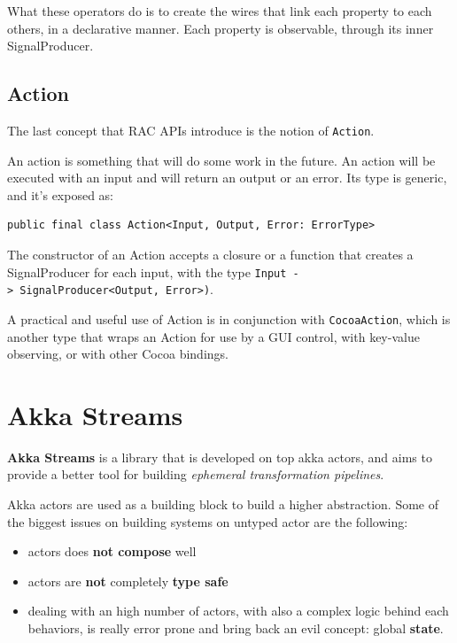What these operators do is to create the wires that link each property
to each others, in a declarative manner. Each property is observable,
through its inner SignalProducer.


\subsection{Action}\label{action}

The last concept that RAC APIs introduce is the notion of
\texttt{Action}.

An action is something that will do some work in the future. An action
will be executed with an input and will return an output or an error.
Its type is generic, and it's exposed as:

\begin{verbatim}
public final class Action<Input, Output, Error: ErrorType>
\end{verbatim}

The constructor of an Action accepts a closure or a function that
creates a SignalProducer for each input, with the type
\texttt{Input\ -\textgreater{}\ SignalProducer\textless{}Output,\ Error\textgreater{})}.

A practical and useful use of Action is in conjunction with
\texttt{CocoaAction}, which is another type that wraps an Action for use
by a GUI control, with key-value observing, or with other Cocoa
bindings.


\section{Akka Streams}\label{akka-streams}

\textbf{Akka Streams} is a library that is developed on top akka actors,
and aims to provide a better tool for building \emph{ephemeral
transformation pipelines}.

Akka actors are used as a building block to build a higher abstraction.
Some of the biggest issues on building systems on untyped actor are the
following:

\begin{itemize}
\itemsep1pt\parskip0pt
\item
  actors does \textbf{not compose} well
\item
  actors are \textbf{not} completely \textbf{type safe}
\item
  dealing with an high number of actors, with also a complex logic
  behind each behaviors, is really error prone and bring back an evil
  concept: global \textbf{state}.
\end{itemize}

